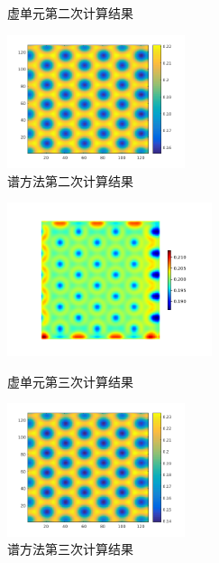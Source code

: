 \documentclass[12pt]{article}
\begin{document}
\begin{CJK}{UTF8}{gkai}
\begin{figure}[H]
\begin{minipage}[!htbp]{0.3\linewidth}
 		\caption*{虚单元第二次计算结果}
 	\end{minipage}
 	\hspace{0.23in}
 	\begin{minipage}[!htbp]{0.3\linewidth}
 		\includegraphics[width=5.2cm]{2.png}
 		\caption*{谱方法第二次计算结果}
 	\end{minipage}
 \end{figure}
  \begin{figure}[H]
	\setlength{\abovecaptionskip}{0.cm}
	\setlength{\belowcaptionskip}{-0.cm}
	\begin{minipage}[!htbp]{0.3\linewidth}
		\includegraphics[width=6cm]{scftfigure3.png}
		\caption*{虚单元第三次计算结果}
	\end{minipage}
	\hspace{0.23in}
	\begin{minipage}[!htbp]{0.3\linewidth}
		\includegraphics[width=5.2cm]{3.png}
		\caption*{谱方法第三次计算结果}
	\end{minipage}
\end{figure}
  \begin{figure}[H]
	\setlength{\abovecaptionskip}{0.cm}
	\setlength{\belowcaptionskip}{-0.cm}
	\begin{minipage}[!htbp]{0.3\linewidth}

\end{minipage}
\end{figure}
\end{CJK}
\end{document}
